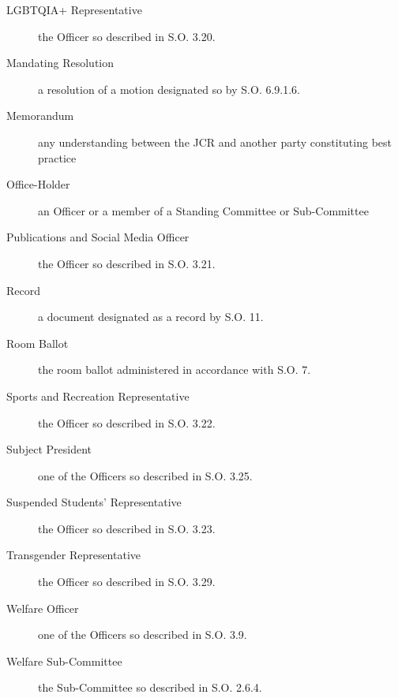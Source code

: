 \begin{description}
\item[LGBTQIA+ Representative] the Officer so described in S.O. 3.20.
\item[Mandating Resolution] a resolution of a motion designated so by S.O. 6.9.1.6.
\item[Memorandum] any understanding between the JCR and another party constituting best practice 
\item[Office-Holder] an Officer or a member of a Standing Committee or Sub-Committee
\item[Publications and Social Media Officer] the Officer so described in S.O. 3.21.
\item[Record] a document designated as a record by S.O. 11.
\item[Room Ballot] the room ballot administered in accordance with S.O. 7.
\item[Sports and Recreation Representative] the Officer so described in S.O. 3.22.
\item[Subject President] one of the Officers so described in S.O. 3.25.
\item[Suspended Students’ Representative] the Officer so described in S.O. 3.23.
\item[Transgender Representative] the Officer so described in S.O. 3.29. 
\item[Welfare Officer] one of the Officers so described in S.O. 3.9.
\item[Welfare Sub-Committee] the Sub-Committee so described in S.O. 2.6.4.
\end{description}